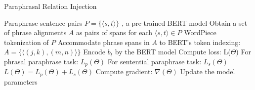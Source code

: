 \documentclass[11pt,a4paper]{article}
\begin{document}
\begin{algorithm} [!t]
\caption{Paraphrasal Relation Injection}
\label{alg:tailoring}
\begin{algorithmic}[1] 
\Require Paraphrase sentence pairs $P=\{\langle s, t \rangle\}$ , a pre-trained BERT model
\State Obtain a set of phrase alignments $A$ as pairs of spans for each $\langle s, t \rangle \in P$ \label{ln:phrase_alignment}
\State WordPiece tokenization of $P$ \label{ln:tokenization}
\State Accommodate phrase spans in $A$ to BERT's token indexing: $A=\{\langle (j, k),  (m, n) \rangle\}$ \label{ln:span_adjustment}
\Repeat
{}
\State Encode $b_t$ by the BERT model
 \State Compute loss: L($\Theta$)
 \State \hspace{\algorithmicindent} For phrasal paraphrase task: $L_p(\Theta)$ \label{ln:phrase_classification}
 \State \hspace{\algorithmicindent} For sentential paraphrase task: $L_s(\Theta)$ \label{ln:sentence_classification}
 \State \hspace{\algorithmicindent} $L(\Theta)=L_p(\Theta)+L_s(\Theta)$
 \State Compute gradient: $\nabla(\Theta)$
 \State Update the model parameters
\EndFor
{}
\end{algorithmic} 
\end{algorithm} 
\end{document}

